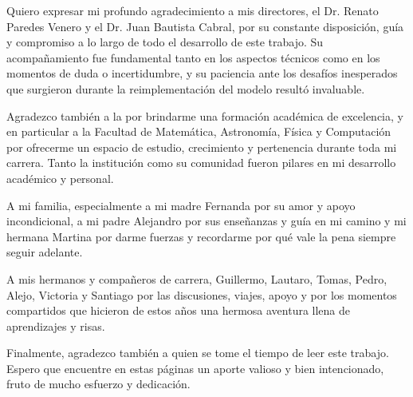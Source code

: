 Quiero expresar mi profundo agradecimiento a mis directores, el Dr. Renato Paredes Venero y el Dr. Juan Bautista Cabral, por su constante disposición, guía y compromiso a lo largo de todo el desarrollo de este trabajo. Su acompañamiento fue fundamental tanto en los aspectos técnicos como en los momentos de duda o incertidumbre, y su paciencia ante los desafíos inesperados que surgieron durante la reimplementación del modelo resultó invaluable.

Agradezco también a la \unc{} por brindarme una formación académica de excelencia, y en particular a la Facultad de Matemática, Astronomía, Física y Computación por ofrecerme un espacio de estudio, crecimiento y pertenencia durante toda mi carrera. Tanto la institución como su comunidad fueron pilares en mi desarrollo académico y personal.

A mi familia, especialmente a mi madre Fernanda por su amor y apoyo incondicional, a mi padre Alejandro por sus enseñanzas y guía en mi camino y mi hermana Martina por darme fuerzas y recordarme por qué vale la pena siempre seguir adelante. 

A mis hermanos y compañeros de carrera, Guillermo, Lautaro, Tomas, Pedro, Alejo, Victoria y Santiago por las discusiones, viajes, apoyo y por los momentos compartidos que hicieron de estos años una hermosa aventura llena de aprendizajes y risas.

Finalmente, agradezco también a quien se tome el tiempo de leer este trabajo. Espero que encuentre en estas páginas un aporte valioso y bien intencionado, fruto de mucho esfuerzo y dedicación.
